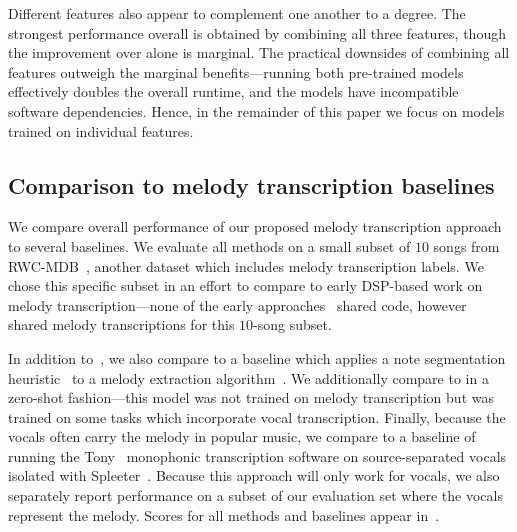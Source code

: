 Different features also appear to complement one another to a degree. 
The strongest performance overall is obtained by combining all three features, though the improvement over \jukebox{} alone is marginal. 
The practical downsides of combining all features outweigh the marginal benefits---running both pre-trained models effectively doubles the overall runtime, and the models have incompatible software dependencies. 
Hence, in the remainder of this paper we focus on models trained on individual features.

\vspace{-1mm}
\subsection{Comparison to melody transcription baselines}
\label{sec:exp2}

We compare overall performance of our proposed melody transcription approach to several baselines. 
We evaluate all methods on a small subset of $10$ songs from RWC-MDB~\cite{goto2002rwc,goto2003rwc,goto2004development}, 
another dataset which includes melody transcription labels. 
We chose this specific subset in an effort to compare to early DSP-based work on melody transcription---none of the early approaches~\cite{paiva2004auditory,paiva2005detection,ryynanen2008automatic,weil2009automatic} shared code, however~\cite{ryynanen2008automatic} shared melody transcriptions for this $10$-song subset.

In addition to~\cite{ryynanen2008automatic}, we also compare to a baseline which applies a note segmentation heuristic~\cite{salamon2015midi} to a melody extraction algorithm~\cite{salamon2014melody}. 
We additionally compare to \mtthree{} in a zero-shot fashion---this model was not trained on melody transcription but was trained on some tasks which incorporate vocal transcription. 
Finally, because the vocals often carry the melody in popular music, we compare to a baseline of running the Tony~\cite{mauch2015computer} monophonic transcription software on source-separated vocals isolated with Spleeter~\cite{hennequin2020spleeter}. 
Because this approach will only work for vocals, we also separately report performance on a subset of our evaluation set where the vocals represent the melody. 
Scores for all methods and baselines appear in~. 

